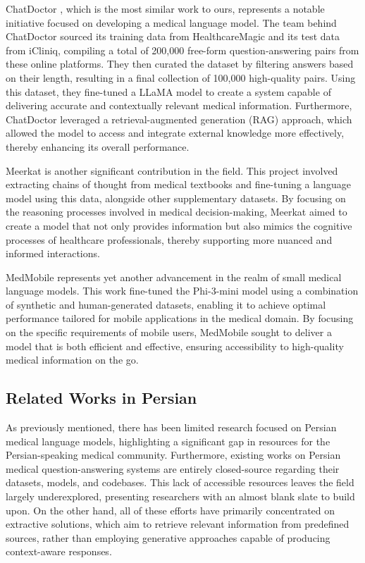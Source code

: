 \documentclass[conference]{IEEEtran}
\begin{document}
ChatDoctor
\cite{b6}, which is the most similar work to ours, represents a notable initiative focused on developing a medical language model. The team behind ChatDoctor sourced its training data from HealthcareMagic and its test data from iCliniq, compiling a total of 200,000 free-form question-answering pairs from these online platforms. They then curated the dataset by filtering answers based on their length, resulting in a final collection of 100,000 high-quality pairs. Using this dataset, they fine-tuned a LLaMA model \cite{b7} to create a system capable of delivering accurate and contextually relevant medical information. Furthermore, ChatDoctor leveraged a retrieval-augmented generation (RAG) approach, which allowed the model to access and integrate external knowledge more effectively, thereby enhancing its overall performance.

Meerkat
\cite{b8}
is another significant contribution in the field. This project involved extracting chains of thought from medical textbooks and fine-tuning a language model using this data, alongside other supplementary datasets. By focusing on the reasoning processes involved in medical decision-making, Meerkat aimed to create a model that not only provides information but also mimics the cognitive processes of healthcare professionals, thereby supporting more nuanced and informed interactions.

MedMobile
\cite{b9}
represents yet another advancement in the realm of small medical language models. This work fine-tuned the Phi-3-mini model
\cite{b10}
using a combination of synthetic and human-generated datasets, enabling it to achieve optimal performance tailored for mobile applications in the medical domain. By focusing on the specific requirements of mobile users, MedMobile sought to deliver a model that is both efficient and effective, ensuring accessibility to high-quality medical information on the go.
\subsection{Related Works in Persian}
As previously mentioned, there has been limited research focused on Persian medical language models, highlighting a significant gap in resources for the Persian-speaking medical community. Furthermore, existing works on Persian medical question-answering systems are entirely closed-source regarding their datasets, models, and codebases. This lack of accessible resources leaves the field largely underexplored, presenting researchers with an almost blank slate to build upon. On the other hand, all of these efforts have primarily concentrated on extractive solutions, which aim to retrieve relevant information from predefined sources, rather than employing generative approaches capable of producing context-aware responses.
\end{document}
